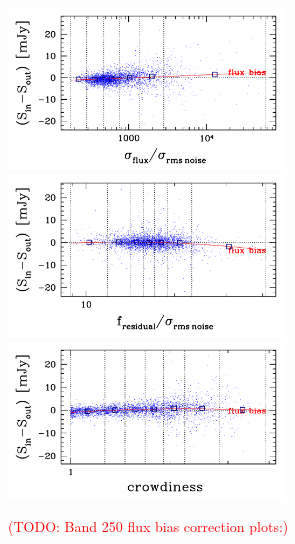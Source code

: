 \documentclass[11pt,a4paper]{article}
\begin{document}
\begin{figure}[H]
	\caption{
		\textcolor{red}{(TODO: Band 250 flux bias correction plots:)}
	}
	\includegraphics[width=0.65\textwidth]{galsim_250_fbias_1}
	\includegraphics[width=0.65\textwidth]{galsim_250_fbias_2}
	\includegraphics[width=0.65\textwidth]{galsim_250_fbias_3}
\end{figure}
\end{document}
